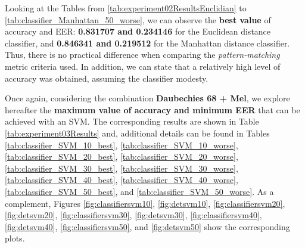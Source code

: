 \par Looking at the Tables from \ref{tab:experiment02ResultsEuclidian} to \ref{tab:classifier_Manhattan_50_worse}, we can observe the \textbf{best value} of accuracy and EER: \textbf{0.831707 and 0.234146} for the Euclidean distance classifier, and \textbf{0.846341 and 0.219512} for the Manhattan distance classifier. Thus, there is no practical difference when comparing the \textit{pattern-matching} metric criteria used. In addition, we can state that a relatively high level of accuracy was obtained, assuming the classifier modesty.
\\
\par Once again, considering the combination \textbf{Daubechies 68 + Mel}, we explore hereafter the \textbf{maximum value of accuracy and minimum EER} that can be achieved with an SVM. The corresponding results are shown in Table \ref{tab:experiment03Results} and, additional details can be found in Tables \ref{tab:classifier_SVM_10_best}, \ref{tab:classifier_SVM_10_worse}, \ref{tab:classifier_SVM_20_best}, \ref{tab:classifier_SVM_20_worse}, \ref{tab:classifier_SVM_30_best}, \ref{tab:classifier_SVM_30_worse}, \ref{tab:classifier_SVM_40_best}, \ref{tab:classifier_SVM_40_worse}, \ref{tab:classifier_SVM_50_best}, and \ref{tab:classifier_SVM_50_worse}. As a complement, Figures \ref{fig:classifiersvm10}, \ref{fig:detsvm10}, \ref{fig:classifiersvm20}, \ref{fig:detsvm20}, \ref{fig:classifiersvm30}, \ref{fig:detsvm30}, \ref{fig:classifiersvm40}, \ref{fig:detsvm40}, \ref{fig:classifiersvm50}, and \ref{fig:detsvm50} show the corresponding plots.\\



